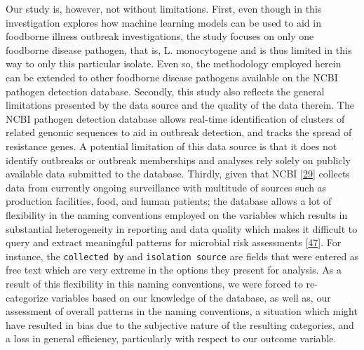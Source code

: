 \documentclass[
  10pt,
]{article}
\begin{document}
Our study is, however, not without limitations. First, even though in this investigation explores how machine learning models can be used to aid in foodborne illness outbreak investigations, the study focuses on only one foodborne disease pathogen, that is, L. monocytogene and is thus limited in this way to only this particular isolate. Even so, the methodology employed herein can be extended to other foodborne disease pathogens available on the NCBI pathogen detection database. Secondly, this study also reflects the general limitations presented by the data source and the quality of the data therein. The NCBI pathogen detection database allows real-time identification of clusters of related genomic sequences to aid in outbreak detection, and tracks the spread of resistance genes. A potential limitation of this data source is that it does not identify outbreaks or outbreak memberships and analyses rely solely on publicly available data submitted to the database. Thirdly, given that NCBI {[}\protect\hyperlink{ref-ncbi2016}{29}{]} collects data from currently ongoing surveillance with multitude of sources such as production facilities, food, and human patients; the database allows a lot of flexibility in the naming conventions employed on the variables which results in substantial heterogeneity in reporting and data quality which makes it difficult to query and extract meaningful patterns for microbial risk assessments {[}\protect\hyperlink{ref-sanaa2019genomegraphr}{47}{]}. For instance, the \texttt{collected\ by} and \texttt{isolation\ source} are fields that were entered as free text which are very extreme in the options they present for analysis. As a result of this flexibility in this naming conventions, we were forced to re-categorize variables based on our knowledge of the database, as well as, our assessment of overall patterns in the naming conventions, a situation which might have resulted in bias due to the subjective nature of the resulting categories, and a loss in general efficiency, particularly with respect to our outcome variable.
\end{document}

